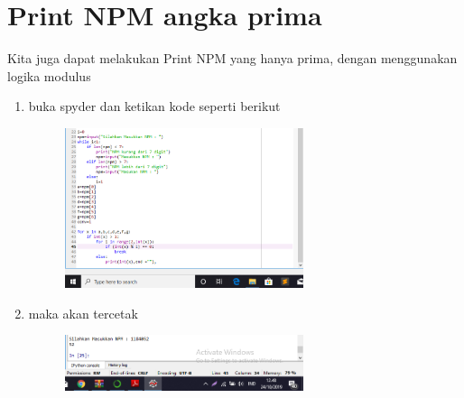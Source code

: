 \chapter*{Print NPM angka prima}
\par Kita juga dapat melakukan Print NPM yang hanya prima, dengan menggunakan logika modulus

\begin{enumerate}
   

\item buka spyder dan ketikan kode seperti berikut
	\begin{figure} [h]
	\includegraphics[width=7cm]{npm/npm7.png}
	\centering
	\end{figure}
	
	
	
 \item maka akan tercetak 
 \begin{figure} [h]
	\includegraphics[width=7cm]{npm/npm8.png}
	\centering
	\end{figure}
 
	
	\end{enumerate}